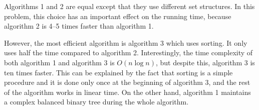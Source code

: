 Algorithms 1 and 2 are equal except that
they use different set structures.
In this problem, this choice has an important effect on
the running time, because algorithm 2
is 4–5 times faster than algorithm 1.

However, the most efficient algorithm is algorithm 3
which uses sorting.
It only uses half the time compared to algorithm 2.
Interestingly, the time complexity of both
algorithm 1 and algorithm 3 is $O(n \log n)$,
but despite this, algorithm 3 is ten times faster.
This can be explained by the fact that
sorting is a simple procedure and it is done
only once at the beginning of algorithm 3,
and the rest of the algorithm works in linear time.
On the other hand,
algorithm 1 maintains a complex balanced binary tree
during the whole algorithm.
